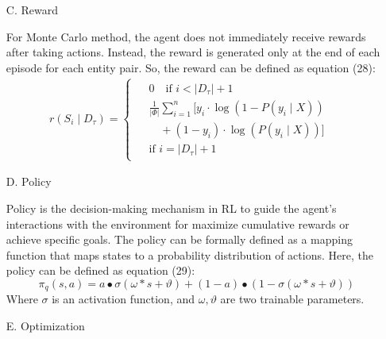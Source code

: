 \documentclass[preprint,12pt]{elsarticle}
\begin{document}
\begin{enumerate}
\item[C.]Reward

For Monte Carlo method, the agent does not immediately receive rewards after taking actions. Instead, the reward is generated only at the end of each episode for each entity pair. So, the reward can be defined as equation (28):
\begin{align}
r(S_{i} \mid D_{\tau}) = 
\begin{cases}
\begin{aligned}
&0 \quad \text{if } i < |D_{\tau}| + 1 \\
&\frac{1}{|\Phi|}\sum_{i=1}^{n} \biggl[ y_{i} \cdot \log\left( 1 - P(y_{i} \mid X) \right) \\
&\quad + (1 - y_{i}) \cdot \log\left( P(y_{i} \mid X) \right) \biggr] \quad \\ &\text{if } i = |D_{\tau}| + 1
\end{aligned}
\end{cases}
\end{align}


\item[D.]Policy

Policy is the decision-making mechanism in RL to guide the agent's interactions with the environment for maximize cumulative rewards or achieve specific goals. The policy can be formally defined as a mapping function that maps states to a probability distribution of actions. Here, the policy can be defined as equation (29):
\begin{equation}
\pi_{q}\left( {s,a} \right) = a \bullet \sigma\left( {\omega*s + \vartheta} \right) + \left( {1 - a} \right) \bullet \left( {1 - \sigma\left( {\omega*s + \vartheta} \right)} \right)
\label{eq29}
\end{equation}
Where $\sigma$ is an activation function, and $\omega,\vartheta$  are  two trainable parameters.

\item[E.]Optimization


\end{enumerate}
\end{document}
